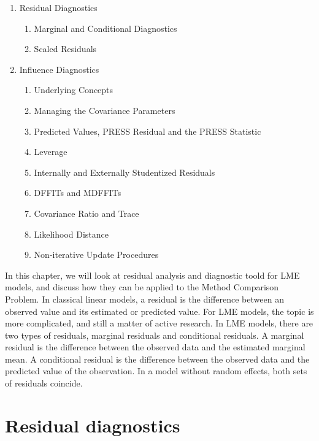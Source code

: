\documentclass[12pt, a4paper]{report}
\theoremstyle{plain}
\theoremstyle{definition}
\theoremstyle{remark}
\begin{document}
	\begin{enumerate}
		\item Residual Diagnostics
		\begin{enumerate}
			\item Marginal and Conditional Diagnostics
			\item Scaled Residuals
		\end{enumerate}
		
		\item Influence Diagnostics
		\begin{enumerate}
			\item Underlying Concepts
			\item Managing the Covariance Parameters
			\item Predicted Values, PRESS Residual and the PRESS Statistic
			\item Leverage
			\item Internally and Externally Studentized Residuals
			\item DFFITs and MDFFITs
			\item Covariance Ratio and Trace
			\item Likelihood Distance
			\item Non-iterative Update Procedures
		\end{enumerate}
	\end{enumerate}
	\newpage
In this chapter, we will look at residual analysis and diagnostic toold for LME models, and discuss how they can be applied to the Method Comparison Problem.	In classical linear models, a residual is the difference between an observed value and its estimated or predicted value. For LME models, the topic is more complicated, and still a matter of active research. In LME models, there are two types of residuals, marginal residuals and conditional residuals. A marginal residual is the difference between the observed data and the estimated marginal mean. A conditional residual is the difference between the observed data and the predicted value of the observation. In a model without random effects, both sets of residuals coincide.
	
	\section{Residual diagnostics} %
\end{document}
